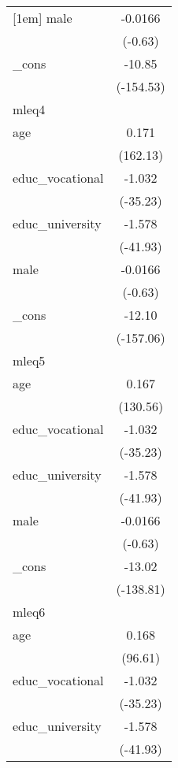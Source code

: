 {\begin{tabular}{l*{1}{c}}
[1em]
male        &     -0.0166         \\
            &     (-0.63)         \\
[1em]
\_cons      &      -10.85\sym{***}\\
            &   (-154.53)         \\
\hline
mleq4       &                     \\
age         &       0.171\sym{***}\\
            &    (162.13)         \\
[1em]
educ\_vocational&      -1.032\sym{***}\\
            &    (-35.23)         \\
[1em]
educ\_university&      -1.578\sym{***}\\
            &    (-41.93)         \\
[1em]
male        &     -0.0166         \\
            &     (-0.63)         \\
[1em]
\_cons      &      -12.10\sym{***}\\
            &   (-157.06)         \\
\hline
mleq5       &                     \\
age         &       0.167\sym{***}\\
            &    (130.56)         \\
[1em]
educ\_vocational&      -1.032\sym{***}\\
            &    (-35.23)         \\
[1em]
educ\_university&      -1.578\sym{***}\\
            &    (-41.93)         \\
[1em]
male        &     -0.0166         \\
            &     (-0.63)         \\
[1em]
\_cons      &      -13.02\sym{***}\\
            &   (-138.81)         \\
\hline
mleq6       &                     \\
age         &       0.168\sym{***}\\
            &     (96.61)         \\
[1em]
educ\_vocational&      -1.032\sym{***}\\
            &    (-35.23)         \\
[1em]
educ\_university&      -1.578\sym{***}\\
            &    (-41.93)         \\

\end{tabular}}
